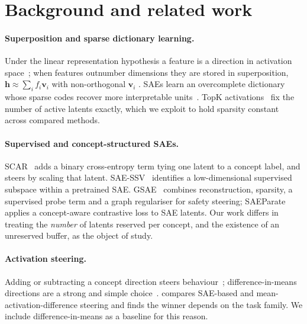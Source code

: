 \documentclass[11pt,a4paper]{article}
\theoremstyle{remark}
\newcommand{\h}{\mathbf{h}}
\begin{document}
\section{Background and related work}
\label{sec:related}

\paragraph{Superposition and sparse dictionary learning.}
Under the linear representation hypothesis a feature is a direction in activation
space~\citep{park2024linear}; when features outnumber dimensions they are stored in
superposition, $\h\approx\sum_i f_i\mathbf v_i$ with non-orthogonal $\mathbf v_i$
\citep{elhage2022toy}. SAEs learn an overcomplete dictionary whose sparse codes recover
more interpretable units~\citep{bricken2023monosemanticity,cunningham2024sparse}. TopK
activations~\citep{makhzani2013ksparse,gao2024scaling} fix the number of active latents exactly,
which we exploit to hold sparsity constant across compared methods.

\paragraph{Supervised and concept-structured SAEs.}
SCAR~\citep{harle2024scar} adds a binary cross-entropy term tying one latent to a concept label,
and steers by scaling that latent. SAE-SSV~\citep{he2025saessv} identifies a low-dimensional
supervised subspace within a pretrained SAE. GSAE~\citep{yeon2025gsae} combines reconstruction,
sparsity, a supervised probe term and a graph regulariser for safety steering;
SAEParate~\citep{kim2026saeparate} applies a concept-aware contrastive loss to SAE latents. Our
work differs in treating the \emph{number} of latents reserved per concept, and the existence of
an unreserved buffer, as the object of study.

\paragraph{Activation steering.}
Adding or subtracting a concept direction steers behaviour~\citep{turner2023actadd,zou2023repe};
difference-in-means directions are a strong and simple
choice~\citep{rimsky2024caa,arditi2024refusal}. \citet{xie2025comparative} compares SAE-based
and mean-activation-difference steering and finds the winner depends on the task family. We
include difference-in-means as a baseline for this reason.
\end{document}
